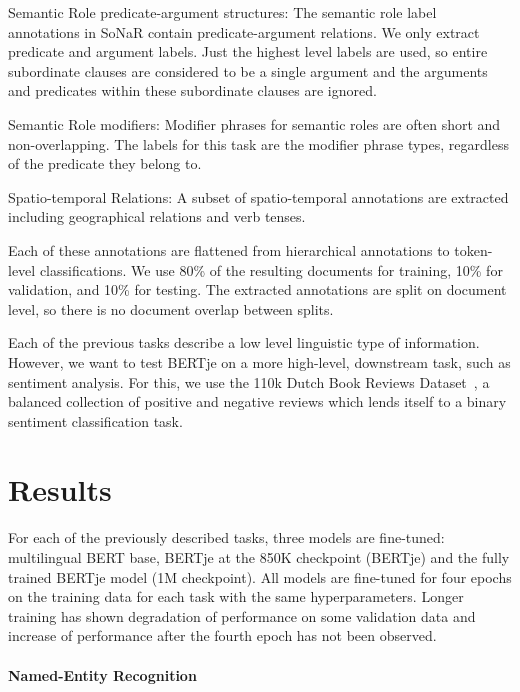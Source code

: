 \documentclass[11pt]{article}
\begin{document}
\begin{description*}
  \item[Semantic Role predicate-argument structures:] The semantic role label annotations in SoNaR contain predicate-argument relations. We only extract predicate and argument labels. Just the highest level labels are used, so entire subordinate clauses are considered to be a single argument and the arguments and predicates within these subordinate clauses are ignored.
  \item[Semantic Role modifiers:] Modifier phrases for semantic roles are often short and non-overlapping. The labels for this task are the modifier phrase types, regardless of the predicate they belong to.
  \item[Spatio-temporal Relations:] A subset of spatio-temporal annotations are extracted including geographical relations and verb tenses.
\end{description*}

\noindent Each of these annotations are flattened from hierarchical annotations to token-level classifications.
We use 80\% of the resulting documents for training,
10\% for validation, and 10\% for testing.
The extracted annotations are split on document level,
so there is no document overlap between splits.

Each of the previous tasks describe a low level linguistic type of information. However, we want to test BERTje on a more high-level, downstream task, such as sentiment analysis. For this, we use the 110k Dutch Book Reviews Dataset~\citep{burgh2019merits},
a balanced collection of positive and negative reviews which lends itself to a binary sentiment classification task.

\section{Results}

For each of the previously described tasks, three models are fine-tuned: multilingual BERT base, BERTje at the 850K checkpoint (BERTje)
and the fully trained BERTje model (1M checkpoint).
All models are fine-tuned for four epochs on the training data for each task with the same hyperparameters.
Longer training has shown degradation of performance on some validation data and increase of performance after the fourth epoch has not been observed.

\paragraph{Named-Entity Recognition}
\end{document}
